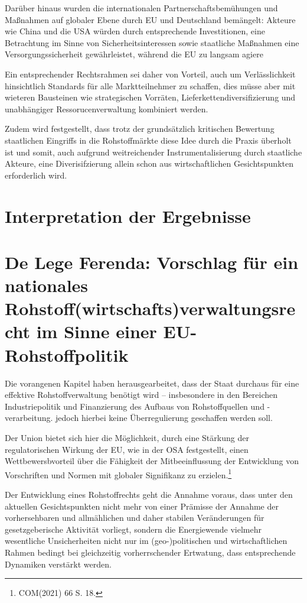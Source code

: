 \documentclass[12pt,a4paper,oneside]{book} %
\begin{document}
Darüber hinaus wurden die internationalen Partnerschaftsbemühungen und Maßnahmen auf globaler Ebene durch EU und Deutschland bemängelt: Akteure wie China und die USA würden durch entsprechende Investitionen, eine Betrachtung im Sinne von Sicherheitsinteressen sowie staatliche Maßnahmen eine Versorgungssicherheit gewährleistet, während die EU zu langsam agiere


Ein entsprechender Rechtsrahmen sei daher von Vorteil, auch um Verlässlichkeit hinsichtlich Standards für alle Marktteilnehmer zu schaffen, dies müsse aber mit wieteren Bausteinen wie strategischen Vorräten, Lieferkettendiversifizierung und unabhängiger Ressorucenverwaltung kombiniert werden.

Zudem wird festgestellt, dass trotz der grundsätzlich kritischen Bewertung staatlichen Eingriffs in die Rohstoffmärkte diese Idee durch die Praxis überholt ist und somit, auch aufgrund weitreichender Instrumentalisierung durch staatliche Akteure, eine Diverisifzierung allein schon aus wirtschaftlichen Gesichtspunkten erforderlich wird.

\section{Interpretation der Ergebnisse}
	

\section{De Lege Ferenda: Vorschlag für ein nationales Rohstoff(wirtschafts)verwaltungsrecht im Sinne einer EU-Rohstoffpolitik}

Die vorangenen Kapitel haben herausgearbeitet, dass der Staat durchaus für eine effektive Rohstoffverwaltung benötigt wird -- insbesondere in den Bereichen Industriepolitik und Finanzierung des Aufbaus von Rohstoffquellen und -verarbeitung. jedoch hierbei keine Überregulierung geschaffen werden soll.

Der Union bietet sich hier die Möglichkeit, durch eine Stärkung der regulatorischen Wirkung der EU, wie in der OSA festgestellt, einen Wettbewersbvorteil über die Fähigkeit der Mitbeeinflussung der Entwicklung von Vorschriften und Normen mit globaler Signifikanz zu erzielen.\footnote{COM(2021) 66 S. 18.}

Der Entwicklung eines Rohstoffrechts geht die Annahme voraus, dass unter den aktuellen Gesichtspunkten nicht mehr von einer Prämisse der Annahme der vorhersehbaren und allmählichen und daher stabilen Veränderungen für gesetzgeberische Aktivität vorliegt\autocite{Craig et al, Balancing stability and flexibility in adaptive governance: an analysis of tools available in U.S. environmental law}, sondern die Energiewende vielmehr wesentliche Unsicherheiten nicht nur im (geo-)politischen und wirtschaftlichen Rahmen bedingt bei gleichzeitig vorherrschender Ertwatung, dass entsprechende Dynamiken verstärkt werden.\autocite{bibid}
\end{document}
